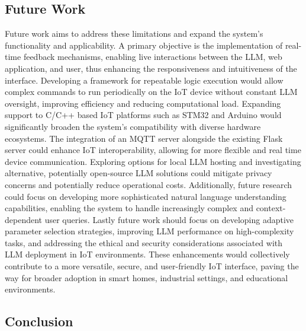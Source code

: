\documentclass{ieeeaccess}
\begin{document}
\subsection{Future Work}

Future work aims to address these limitations and expand the system's functionality and applicability. A primary objective is the implementation of real-time feedback mechanisms, enabling live interactions between the LLM, web application, and user, thus enhancing the responsiveness and intuitiveness of the interface. Developing a framework for repeatable logic execution would allow complex commands to run periodically on the IoT device without constant LLM oversight, improving efficiency and reducing computational load. Expanding support to C/C++ based IoT platforms such as STM32 and Arduino would significantly broaden the system's compatibility with diverse hardware ecosystems. The integration of an MQTT server alongside the existing Flask server could enhance IoT interoperability, allowing for more flexible and real time device communication. Exploring options for local LLM hosting and investigating alternative, potentially open-source LLM solutions could mitigate privacy concerns and potentially reduce operational costs. Additionally, future research could focus on developing more sophisticated natural language understanding capabilities, enabling the system to handle increasingly complex and context-dependent user queries. Lastly future work should focus on developing adaptive parameter selection strategies, improving LLM performance on high-complexity tasks, and addressing the ethical and security considerations associated with LLM deployment in IoT environments. These enhancements would collectively contribute to a more versatile, secure, and user-friendly IoT interface, paving the way for broader adoption in smart homes, industrial settings, and educational environments. 
\subsection{Conclusion}
\end{document}

